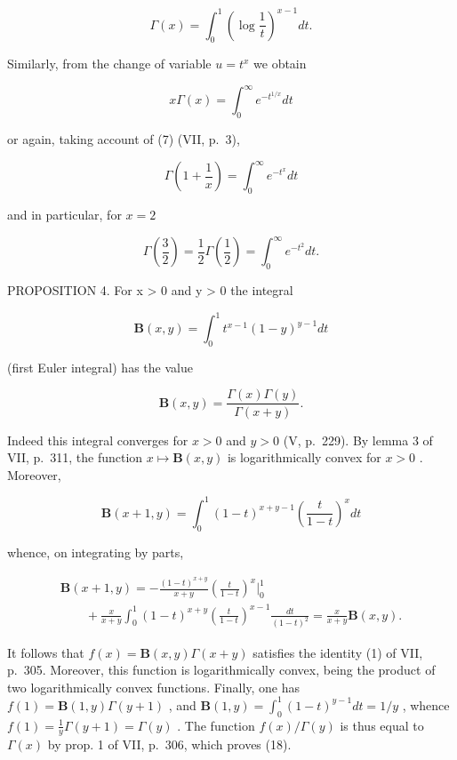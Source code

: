 \[
\Gamma (x) = \int_ {0} ^ {1} \left(\log \frac {1}{t}\right) ^ {x - 1} d t.\tag{15}
\]

Similarly, from the change of variable \(u = t^{x}\) we obtain

\[
x \Gamma (x) = \int_ {0} ^ {\infty} e ^ {- t ^ {1 / x}} d t
\]

or again, taking account of (7) (VII, p.~3),

\[
\Gamma \left(1 + \frac {1}{x}\right) = \int_ {0} ^ {\infty} e ^ {- t ^ {x}} d t\tag{16}
\]

and in particular, for \(x = 2\)

\[
\Gamma \left(\frac {3}{2}\right) = \frac {1}{2} \Gamma \left(\frac {1}{2}\right) = \int_ {0} ^ {\infty} e ^ {- t ^ {2}} d t.\tag{17}
\]

PROPOSITION 4. For x \textgreater{} 0 and y \textgreater{} 0 the integral

\[
\mathbf {B} (x, y) = \int_ {0} ^ {1} t ^ {x - 1} (1 - y) ^ {y - 1} d t
\]

(first Euler integral) has the value

\[
\mathbf {B} (x, y) = \frac {\Gamma (x) \Gamma (y)}{\Gamma (x + y)}.\tag{18}
\]

Indeed this integral converges for \(x > 0\) and \(y > 0\) (V, p.~229). By lemma 3 of VII, p.~311, the function \(x \mapsto \mathbf{B}(x, y)\) is logarithmically convex for \(x > 0\) . Moreover,

\[
\mathbf {B} (x + 1, y) = \int_ {0} ^ {1} (1 - t) ^ {x + y - 1} \left(\frac {t}{1 - t}\right) ^ {x} d t
\]

whence, on integrating by parts,

\[
\begin{array}{l} \mathbf {B} (x + 1, y) = - \frac {(1 - t) ^ {x + y}}{x + y} \left(\frac {t}{1 - t}\right) ^ {x} \Bigg | _ {0} ^ {1} \\ \qquad + \frac {x}{x + y} \int_ {0} ^ {1} (1 - t) ^ {x + y} \left(\frac {t}{1 - t}\right) ^ {x - 1} \frac {d t}{(1 - t) ^ {2}} = \frac {x}{x + y} \mathbf {B} (x, y). \end{array}
\]

It follows that \(f(x) = \mathbf{B}(x, y) \Gamma(x + y)\) satisfies the identity (1) of VII, p.~305. Moreover, this function is logarithmically convex, being the product of two logarithmically convex functions. Finally, one has \(f(1) = \mathbf{B}(1, y) \Gamma(y + 1)\) , and \(\mathbf{B}(1, y) = \int_{0}^{1} (1 - t)^{y - 1} dt = 1/y\) , whence \(f(1) = \frac{1}{y} \Gamma(y + 1) = \Gamma(y)\) . The function \(f(x)/\Gamma(y)\) is thus equal to \(\Gamma(x)\) by prop. 1 of VII, p.~306, which proves (18).

